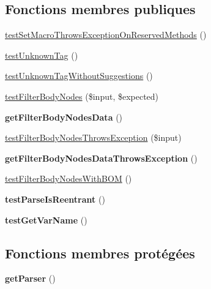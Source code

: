 \subsection*{Fonctions membres publiques}
\begin{DoxyCompactItemize}
\item 
\hyperlink{class_twig___tests___parser_test_ac25da4f037f4fc18b957103a717c3196}{test\+Set\+Macro\+Throws\+Exception\+On\+Reserved\+Methods} ()
\item 
\hyperlink{class_twig___tests___parser_test_a3d10d385ab978158b0f3c41941037b7d}{test\+Unknown\+Tag} ()
\item 
\hyperlink{class_twig___tests___parser_test_a0cdfa5b4d1c85bfa1663efd4c2f55ac8}{test\+Unknown\+Tag\+Without\+Suggestions} ()
\item 
\hyperlink{class_twig___tests___parser_test_af142626b2b0c2129e5c144153dacc0f0}{test\+Filter\+Body\+Nodes} (\$input, \$expected)
\item 
{\bfseries get\+Filter\+Body\+Nodes\+Data} ()\hypertarget{class_twig___tests___parser_test_a0716c79e359fc420898077e5fc2b0c38}{}\label{class_twig___tests___parser_test_a0716c79e359fc420898077e5fc2b0c38}

\item 
\hyperlink{class_twig___tests___parser_test_a9fb3bcfaf8086afa164b0776c523f3f7}{test\+Filter\+Body\+Nodes\+Throws\+Exception} (\$input)
\item 
{\bfseries get\+Filter\+Body\+Nodes\+Data\+Throws\+Exception} ()\hypertarget{class_twig___tests___parser_test_a34b0c525b448acc0e82535ac28e1bb5e}{}\label{class_twig___tests___parser_test_a34b0c525b448acc0e82535ac28e1bb5e}

\item 
\hyperlink{class_twig___tests___parser_test_abcd536cc31a0ef15aa75ebe4381b70eb}{test\+Filter\+Body\+Nodes\+With\+B\+OM} ()
\item 
{\bfseries test\+Parse\+Is\+Reentrant} ()\hypertarget{class_twig___tests___parser_test_a4d09f931b8d00c038b0d915f7f746182}{}\label{class_twig___tests___parser_test_a4d09f931b8d00c038b0d915f7f746182}

\item 
{\bfseries test\+Get\+Var\+Name} ()\hypertarget{class_twig___tests___parser_test_a3c260e5b12b99c77eda121c4ca9cf004}{}\label{class_twig___tests___parser_test_a3c260e5b12b99c77eda121c4ca9cf004}

\end{DoxyCompactItemize}
\subsection*{Fonctions membres protégées}
\begin{DoxyCompactItemize}
\item 
{\bfseries get\+Parser} ()\hypertarget{class_twig___tests___parser_test_a4b6907ea868dc9053e1f7d6260fa4b4f}{}\label{class_twig___tests___parser_test_a4b6907ea868dc9053e1f7d6260fa4b4f}

\end{DoxyCompactItemize}


